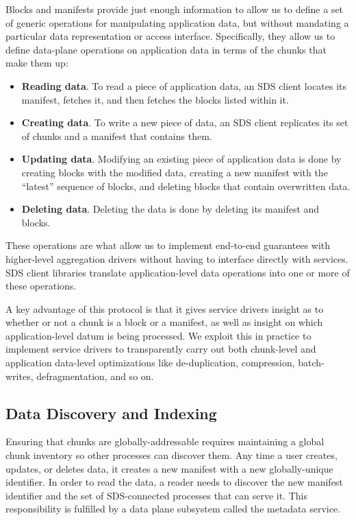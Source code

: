 Blocks and manifests provide just enough information to allow us to define a
set of generic operations for manipulating application data, but
without mandating a particular data representation or access interface.
Specifically, they allow us to define data-plane operations on
application data in terms of the chunks that make them up:

\begin{itemize}
   \item \textbf{Reading data}.  To read a piece of application data, an SDS client locates
    its manifest, fetches it, and then fetches the blocks listed within it.

   \item \textbf{Creating data}.  To write a new piece of data, an SDS client replicates
    its set of chunks and a manifest that contains them.

   \item \textbf{Updating data}.  Modifying an existing
    piece of application data is done by creating blocks with the modified data,
    creating a new manifest with the ``latest'' sequence of blocks, and deleting
    blocks that contain overwritten data.

   \item \textbf{Deleting data}.  Deleting the data is done by
    deleting its manifest and blocks.
\end{itemize}

These operations are what allow us to implement end-to-end
guarantees with higher-level aggregation drivers without having to interface
directly with services.  SDS client libraries translate application-level data
operations into one or more of these operations.

A key advantage of this protocol is that it gives service drivers insight as to whether or not a
chunk is a block or a manifest, as well as insight on which application-level
datum is being processed.  We exploit this in practice to implement
service drivers to transparently carry out both chunk-level and application
data-level optimizations like de-duplication, compression, batch-writes,
defragmentation, and so on.

\subsection{Data Discovery and Indexing}

Ensuring that chunks are globally-addressable requires maintaining a global
chunk inventory so other processes can discover them.  Any time a user creates,
updates, or deletes data, it creates a new manifest
with a new globally-unique identifier.  In order to read the data, a reader
needs to discover the new manifest identifier and the set of SDS-connected
processes that can serve it.  This responsibility is fulfilled by a data plane
subsystem called the metadata service.

